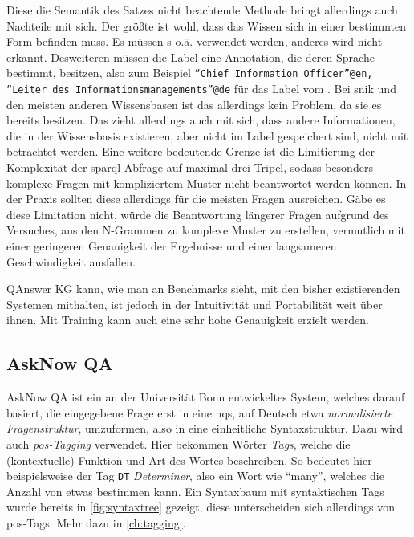 Diese die Semantik des Satzes nicht beachtende Methode bringt allerdings auch Nachteile mit sich.
Der größte ist wohl, dass das Wissen sich in einer bestimmten Form befinden muss.
Es müssen s o.ä. verwendet werden, anderes wird nicht erkannt.
Desweiteren müssen die Label eine Annotation, die deren Sprache bestimmt, besitzen, also zum Beispiel \texttt{\enquote{Chief Information Officer}@en, \enquote{Leiter des Informationsmanagements}@de}
für das Label vom .
Bei \ac{snik} und den meisten anderen Wissensbasen ist das allerdings kein Problem, da sie es bereits besitzen.
Das zieht allerdings auch mit sich, dass andere Informationen, die in der Wissensbasis existieren, aber nicht im Label gespeichert sind, nicht mit betrachtet werden.
Eine weitere bedeutende Grenze ist die Limitierung der Komplexität der \ac{sparql}-Abfrage auf maximal drei Tripel, sodass besonders komplexe Fragen mit kompliziertem Muster nicht beantwortet werden können.
In der Praxis sollten diese allerdings für die meisten Fragen ausreichen.
Gäbe es diese Limitation nicht, würde die Beantwortung längerer Fragen aufgrund des Versuches, aus den N-Grammen zu komplexe Muster zu erstellen,
vermutlich mit einer geringeren Genauigkeit der Ergebnisse und einer langsameren Geschwindigkeit ausfallen.

QAnswer KG kann, wie man an Benchmarks sieht, mit den bisher existierenden Systemen mithalten, ist jedoch in der Intuitivität und Portabilität weit über ihnen.
Mit Training kann auch eine sehr hohe Genauigkeit erzielt werden.

\subsection{AskNow QA}

AskNow QA \citep{asknow} ist ein an der Universität Bonn entwickeltes System, welches darauf basiert,
die eingegebene Frage erst in eine \ac{nqs}, auf Deutsch etwa \emph{normalisierte Fragenstruktur}, umzuformen, also in eine einheitliche Syntaxstruktur.
Dazu wird auch \emph{\ac{pos}-Tagging} verwendet.
Hier bekommen Wörter \emph{Tags}, welche die (kontextuelle) Funktion und Art des Wortes beschreiben.
So bedeutet hier beispielsweise der Tag \texttt{DT} \emph{Determiner}, also ein Wort wie \enquote{many}, welches die Anzahl von etwas bestimmen kann.
Ein Syntaxbaum mit syntaktischen Tags wurde bereits in \cref{fig:syntaxtree} gezeigt, diese unterscheiden sich allerdings von \ac{pos}-Tags.
Mehr dazu in \cref{ch:tagging}.

